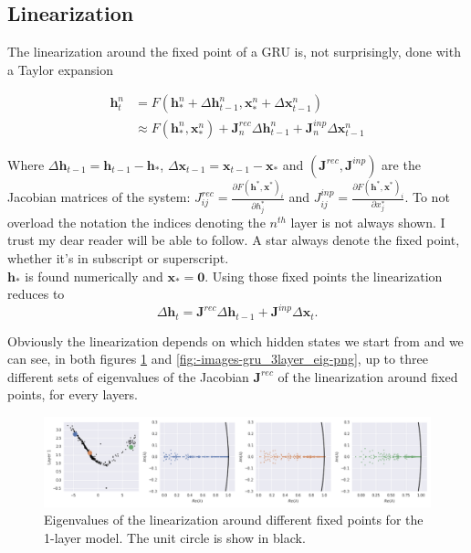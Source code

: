 \documentclass{article}
\begin{document}
\subsection{Linearization}

The linearization around the fixed point of a GRU is, not surprisingly, done with a Taylor expansion

\begin{align}
  \textbf{h}_t^n &= F\left( \textbf{h}_*^n + \Delta \textbf{h}_{t-1}^n, \textbf{x}_*^n + \Delta \textbf{x}_{t-1}^n \right) \\
                 & \approx F\left( \textbf{h}_*^n, \textbf{x}_*^n \right) + \textbf{J}_n^{rec}\Delta \textbf{h}_{t-1}^n + \textbf{J}_n^{inp}\Delta \textbf{x}_{t-1}^n
\end{align}

Where $\Delta \textbf{h}_{t-1} = \textbf{h}_{t-1} - \textbf{h}_*$, $\Delta \textbf{x}_{t-1} = \textbf{x}_{t-1} - \textbf{x}_*$ and $\left(\textbf{J}^{rec}, \textbf{J}^{inp}\right)$ are the Jacobian matrices  of the system:  $J_{ij}^{rec}=\frac{\partial F\left( \textbf{h}^*, \textbf{x}^* \right)_i }{\partial h^*_j} $ and $J_{ij}^{inp}=\frac{\partial F\left( \textbf{h}^*, \textbf{x}^* \right)_i }{\partial x^*_j} $. To not overload the notation the indices denoting the $n^{th}$ layer is not always shown. I trust my dear reader will be able to follow. A star always denote the fixed point, whether it's in subscript or superscript.\\
$\textbf{h}_*$ is found numerically and  $\textbf{x}_*=\textbf{0}$. Using those fixed points the linearization reduces to
\[
  \Delta \textbf{h}_t = \textbf{J}^{rec} \Delta \textbf{h}_{t-1} + \textbf{J}^{inp}  \Delta \textbf{x}_{t}
.\] 

Obviously the linearization depends on which hidden states we start from and we can see, in both figures \ref{fig:-images-gru_1layer_eig-png} and \ref{fig:-images-gru_3layer_eig-png}, up to three different sets of eigenvalues of the Jacobian $\textbf{J}^{rec}$ of the linearization around fixed points, for every layers.

\begin{figure}[H]
  \centering
  \includegraphics[width=1\textwidth]{../images/gru_1layer_100_eig.png}
  \caption{Eigenvalues of the linearization around different fixed points for the 1-layer model.
  The unit circle is show in black.}
  \label{fig:-images-gru_1layer_eig-png}
\end{figure}
\end{document}
